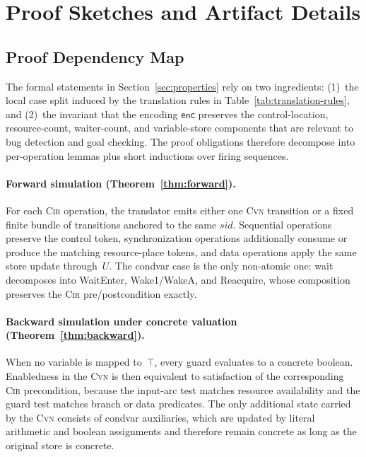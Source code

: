 \section{Proof Sketches and Artifact Details}
\label{app:proofs}

\subsection{Proof Dependency Map}
\label{app:proof-map}

The formal statements in Section~\ref{sec:properties} rely on two ingredients: (1)~the local case split induced by the translation rules in Table~\ref{tab:translation-rules}, and (2)~the invariant that the encoding $\mathsf{enc}$ preserves the control-location, resource-count, waiter-count, and variable-store components that are relevant to bug detection and goal checking. The proof obligations therefore decompose into per-operation lemmas plus short inductions over firing sequences.

\paragraph{Forward simulation (Theorem~\ref{thm:forward}).}
For each \textsc{Cir} operation, the translator emits either one \textsc{Cvn} transition or a fixed finite bundle of transitions anchored to the same $\mathit{sid}$. Sequential operations preserve the control token, synchronization operations additionally consume or produce the matching resource-place tokens, and data operations apply the same store update through~$U$. The condvar case is the only non-atomic one: \textsf{wait} decomposes into WaitEnter, Wake1/WakeA, and Reacquire, whose composition preserves the \textsc{Cir} pre/postcondition exactly.

\paragraph{Backward simulation under concrete valuation (Theorem~\ref{thm:backward}).}
When no variable is mapped to~$\top$, every guard evaluates to a concrete boolean. Enabledness in the \textsc{Cvn} is then equivalent to satisfaction of the corresponding \textsc{Cir} precondition, because the input-arc test matches resource availability and the guard test matches branch or data predicates. The only additional state carried by the \textsc{Cvn} consists of condvar auxiliaries, which are updated by literal arithmetic and boolean assignments and therefore remain concrete as long as the original store is concrete.

